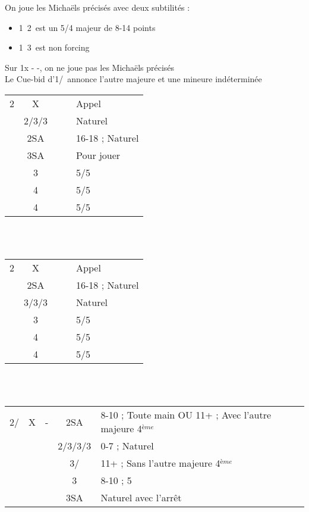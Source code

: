 \documentclass[a4paper, oneside, 11pt]{report}
\begin{document}
		On joue les Michaëls précisés avec deux subtilités :
		\begin{itemize}
		\item 1\trefle\ 2\trefle\ est un 5/4 majeur de 8-14 points
		\item 1\carreau\ 3\trefle\ est non forcing\\
		\end{itemize}

		Sur 1x - -, on ne joue pas les Michaëls précisés\\
		Le Cue-bid d'1\coeur/\pique\ annonce l'autre majeure et une mineure indéterminée

\newpage
		\begin{tabular}{cccc|l}
		2\coeur & X &&& Appel\\
		& 2\pique/3\trefle/3\carreau &&& Naturel\\
		& 2SA &&& 16-18 ; Naturel\\
		& 3SA &&& Pour jouer\\
		& 3\coeur &&& 5\trefle/5\carreau\\
		& 4\trefle &&& 5\trefle/5\pique\\
		& 4\carreau &&& 5\carreau/5\pique\\
		\end{tabular}\\\\
	
		\begin{tabular}{cccc|l}
		2\pique & X &&& Appel\\
		& 2SA &&& 16-18 ; Naturel\\
		& 3\trefle/3\carreau/3\coeur &&& Naturel\\
		& 3\pique &&& 5\trefle/5\carreau\\
		& 4\trefle &&& 5\trefle/5\coeur\\
		& 4\carreau &&& 5\carreau/5\coeur\\
		\end{tabular}\\\\

		\begin{tabular}{cccc|l}
		2\coeur/\pique & X & - & 2SA & 8-10 ; Toute main OU 11+ ; Avec l'autre majeure 4$^{ème}$\\
		&&& 2\pique/3\trefle/3\carreau/3\coeur & 0-7 ; Naturel\\
		&&& 3\coeur/\pique & 11+ ; Sans l'autre majeure 4$^{ème}$\\
		&&& 3\pique & 8-10 ; 5\pique\\
		&&& 3SA & Naturel avec l'arrêt\\
		\end{tabular}\\\\
\end{document}
